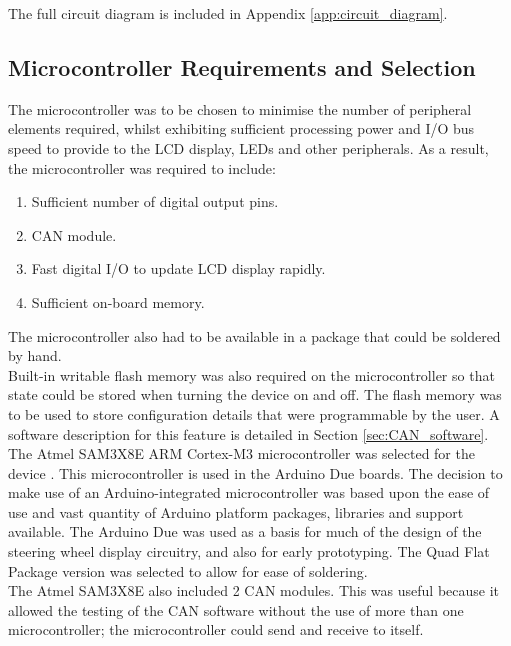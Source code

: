 \documentclass[a4paper,12pt]{article}
\begin{document}
The full circuit diagram is included in Appendix \ref{app:circuit_diagram}.

\subsection{Microcontroller Requirements and Selection}
\label{sec:microcontroller}

The microcontroller was to be chosen to minimise the number of peripheral elements required, whilst exhibiting sufficient processing power and I/O bus speed to provide to the LCD display, LEDs and other peripherals. As a result, the microcontroller was required to include:

\begin{enumerate}
  \item Sufficient number of digital output pins.
  \item CAN module.
  \item Fast digital I/O to update LCD display rapidly.
  \item Sufficient on-board memory.
\end{enumerate}

The microcontroller also had to be available in a package that could be soldered by hand. \\

Built-in writable flash memory was also required on the microcontroller so that state could be stored when turning the device on and off. The flash memory was to be used to store configuration details that were programmable by the user. A software description for this feature is detailed in Section \ref{sec:CAN_software}. \\

The Atmel SAM3X8E ARM Cortex-M3 microcontroller was selected for the device \cite{microcontroller}. This microcontroller is used in the Arduino Due boards. The decision to make use of an Arduino-integrated microcontroller was based upon the ease of use and vast quantity of Arduino platform packages, libraries and support available. The Arduino Due was used as a basis for much of the design of the steering wheel display circuitry, and also for early prototyping. The Quad Flat Package version was selected to allow for ease of soldering. \\

The Atmel SAM3X8E also included 2 CAN modules. This was useful because it allowed the testing of the CAN software without the use of more than one microcontroller; the microcontroller could send and receive to itself. \\
\end{document}
